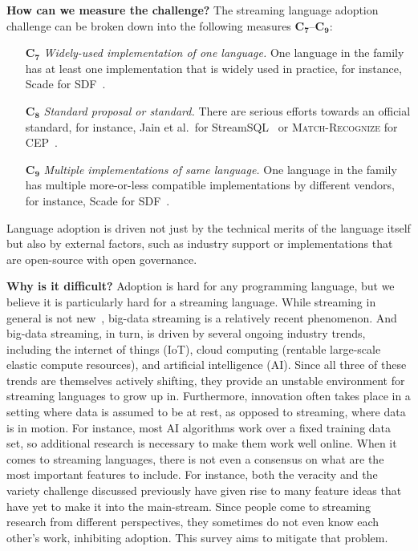 \textbf{How can we measure the challenge?}
The streaming language  adoption challenge can be broken down
into the following measures $\mathbf{C_7}$--$\mathbf{C_9}$:

\begin{itemize}
  \item[$\mathbf{C_7}$] \emph{Widely-used implementation of one
    language.}  One language in the family has at least one
    implementation that is widely used in practice, for instance,
    Scade for SDF~\cite{scade_2017}.
  \item[$\mathbf{C_8}$] \emph{Standard proposal or standard.}  There
    are serious efforts towards an official standard, for instance,
    Jain et al.\ for StreamSQL~\cite{jain_et_al_2008} or
    \textsc{Match-Recognize} for CEP~\cite{zemke_et_al_2007}.
  \item[$\mathbf{C_9}$] \emph{Multiple implementations of same
    language.}  One language in the family has multiple more-or-less
    compatible implementations by different vendors, for instance,
    Scade for SDF~\cite{scade_2017}.
\end{itemize}

Language adoption is driven not just by the technical merits of the
language itself but also by external factors, such as industry support
or implementations that are open-source with open governance.

\textbf{Why is it difficult?}
Adoption is hard for any programming language, but we believe it is
particularly hard for a streaming language. While streaming in general
is not new~\cite{stephens_1997}, big-data streaming is a relatively
recent phenomenon. And big-data streaming, in turn, is driven by
several ongoing industry trends, including the internet of things
(IoT), cloud computing (rentable large-scale elastic compute
resources), and artificial intelligence (AI). Since all three of these
trends are themselves actively shifting, they provide an unstable
environment for streaming languages to grow up in. Furthermore,
innovation often takes place in a setting where data is assumed to be
at rest, as opposed to streaming, where data is in motion. For
instance, most AI algorithms work over a fixed training data set, so
additional research is necessary to make them work well online.  When
it comes to streaming languages, there is not even a consensus on what
are the most important features to include. For instance, both the
veracity and the variety challenge discussed previously have given
rise to many feature ideas that have yet to make it into the
main-stream.  Since people come to streaming research from different
perspectives, they sometimes do not even know each other's work,
inhibiting adoption. This survey aims to mitigate that problem.
